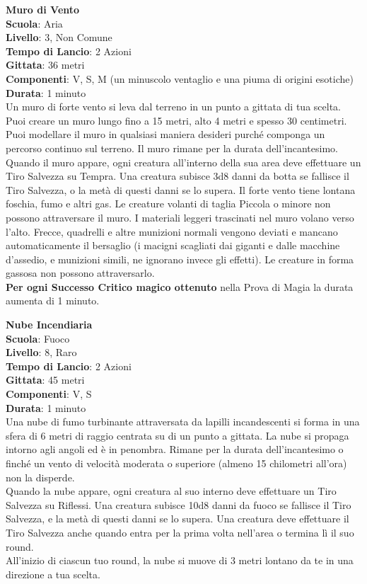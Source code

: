 \begin{multicols}{2}
\medskip\textbf{Muro di Vento}\\
\textbf{Scuola}: Aria\\
\textbf{Livello}: 3, Non Comune\\
\textbf{Tempo di Lancio}: 2 Azioni\\
\textbf{Gittata}: 36 metri\\
\textbf{Componenti}: V, S, M (un minuscolo ventaglio e una piuma di origini esotiche)\\
\textbf{Durata}: 1 minuto\\
Un muro di forte vento si leva dal terreno in un punto a gittata di tua scelta. Puoi creare un muro lungo fino a 15 metri, alto 4 metri e spesso 30 centimetri. Puoi modellare il muro in qualsiasi maniera desideri purché componga un percorso continuo sul terreno. Il muro rimane per la durata dell'incantesimo. Quando il muro appare, ogni creatura all'interno della sua area deve effettuare un Tiro Salvezza su Tempra. Una creatura subisce 3d8 danni da botta se fallisce il Tiro Salvezza, o la metà di questi danni se lo supera. Il forte vento tiene lontana foschia, fumo e altri gas. Le creature volanti di taglia Piccola o minore non possono attraversare il muro. I materiali leggeri trascinati nel muro volano verso l'alto. Frecce, quadrelli e altre munizioni normali vengono deviati e mancano automaticamente il bersaglio (i macigni scagliati dai giganti e dalle macchine d'assedio, e munizioni simili, ne ignorano invece gli effetti). Le creature in forma gassosa non possono attraversarlo.\\
\textbf{Per ogni Successo Critico magico ottenuto} nella Prova di Magia la durata aumenta di 1 minuto.

\medskip\textbf{Nube Incendiaria}\\
\textbf{Scuola}: Fuoco\\
\textbf{Livello}: 8, Raro\\
\textbf{Tempo di Lancio}: 2 Azioni\\
\textbf{Gittata}: 45 metri\\
\textbf{Componenti}: V, S\\
\textbf{Durata}: 1 minuto\\
Una nube di fumo turbinante attraversata da lapilli incandescenti si forma in una sfera di 6 metri di raggio centrata su di un punto a gittata. La nube si propaga intorno agli angoli ed è in penombra. Rimane per la durata dell'incantesimo o finché un vento di velocità moderata o superiore (almeno 15 chilometri all'ora) non la disperde.\\
Quando la nube appare, ogni creatura al suo interno deve effettuare un Tiro Salvezza su Riflessi. Una creatura subisce 10d8 danni da fuoco se fallisce il Tiro Salvezza, e la metà di questi danni se lo supera. Una creatura deve effettuare il Tiro Salvezza anche quando entra per la prima volta nell'area o termina lì il suo round.\\
All'inizio di ciascun tuo round, la nube si muove di 3 metri lontano da te in una direzione a tua scelta.


\end{multicols}
